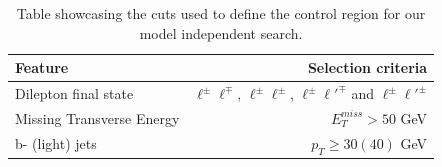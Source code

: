 \documentclass[12pt, a4paper]{book}
\begin{document}
\begin{table}[!h]
    \centering\caption[Control region for model-indepentent search]{Table showcasing the cuts used to define the control region for our model independent search.}
    \begin{tabular}{l|r}\midrule\midrule
        Feature                                                                 & Selection criteria        \\\midrule
        Dilepton final state                                                    & $\ell^\pm \ell^\mp$, $\ell^\pm \ell^\pm$, $\ell^\pm \ell'^\mp$ and $\ell^\pm \ell'^\pm$    \\
        Missing Transverse Energy                                               & $E_T^{miss} > 50$ GeV     \\
        b- (light) jets                                                         & $p_T \ge 30(40)$ GeV     \\\midrule\midrule
    \end{tabular}
    \label{tab:CR_cuts}
\end{table}
\end{document}
